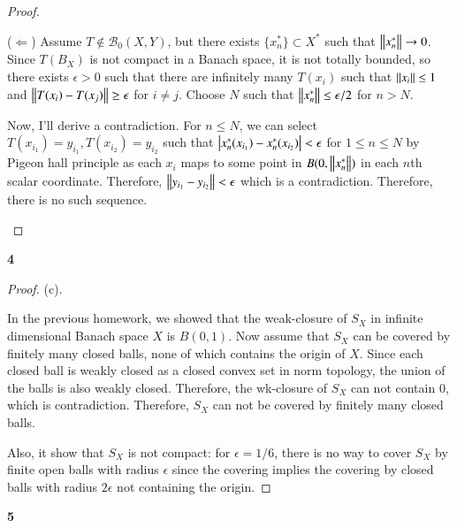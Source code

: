 \documentclass[a4paper, 12pt]{article}
\theoremstyle{Mydefinition}
\theoremstyle{Mytheorem}
\begin{document}
\begin{proof}
\begin{enumerate}
    
    ($\Leftarrow$) Assume $T\notin \mathcal{B}_0(X,Y)$, but there exists $\{x_n^*\}\subset X^*$ such that $\norm{x_n^*}\rightarrow 0$. Since $T(B_X)$ is not compact in a Banach space, it is not totally bounded, so there exists $\epsilon>0$ such that there are infinitely many $T(x_i)$ such that $\norm{x_i} \leq 1$ and $\norm{T(x_i)-T(x_j)}\geq\epsilon$ for $i\neq j$. Choose $N$ such that $\norm{x_n^*}\leq \epsilon/2$ for $n>N$.
    
    Now, I'll derive a contradiction. For $n\leq N$, we can select $T(x_{i_1}) = y_{i_1}, T(x_{i_2}) = y_{i_2}$ such that $\abs{x_n^*(x_{i_1})-x_n^*(x_{i_2})}<\epsilon$ for $1\leq n\leq N$ by Pigeon hall principle as each $x_i$ maps to some point in $B(0, \norm{x^*_n})$ in each $n$th scalar coordinate. Therefore, $\norm{y_{i_1}-y_{i_2}}<\epsilon$ which is a contradiction. Therefore, there is no such sequence.
    
    
    
\end{enumerate}
\end{proof}

\noindent \textbf{4}
\begin{proof}
    (c).
    
    In the previous homework, we showed that the weak-closure of $S_X$ in infinite dimensional Banach space $X$ is $B(0, 1)$. Now assume that $S_X$ can be covered by finitely many closed balls, none of which contains the origin of $X$. Since each closed ball is weakly closed as a closed convex set in norm topology, the union of the balls is also weakly closed. Therefore, the wk-closure of $S_X$ can not contain $0$, which is contradiction. Therefore, $S_X$ can not be covered by finitely many closed balls.
    
    Also, it show that $S_X$ is not compact: for $\epsilon = 1/6$, there is no way to cover $S_X$ by finite open balls with radius $\epsilon$ since the covering implies the covering by closed balls with radius $2\epsilon$ not containing the origin.
\end{proof}

\noindent \textbf{5}
\end{document}
